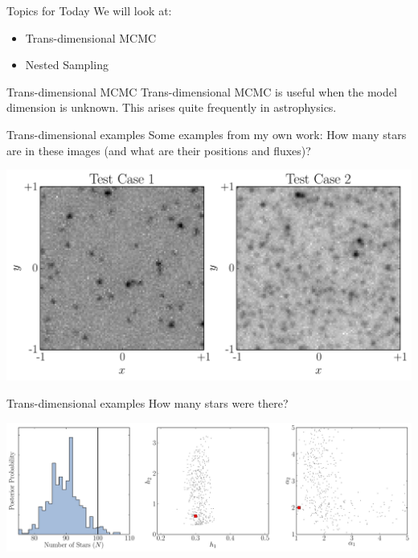 
\begin{frame}[t,plain]
\titlepage
\end{frame}

\begin{frame}[t]{Topics for Today}
We will look at:

\begin{itemize}
\item Trans-dimensional MCMC
\item Nested Sampling
\end{itemize}

\end{frame}


\begin{frame}[t]{Trans-dimensional MCMC}
Trans-dimensional MCMC is useful when the model dimension is unknown. This
arises quite frequently in astrophysics.
\end{frame}


\begin{frame}[t]{Trans-dimensional examples}
Some examples from my own work: How many stars are in these images (and what are their positions and fluxes)?

\begin{center}
\includegraphics[scale=0.4]{starfield.pdf}
\end{center}

\end{frame}

\begin{frame}[t]{Trans-dimensional examples}
How many stars were there?

\begin{center}
\includegraphics[scale=0.25]{inference1.pdf}
\end{center}

\end{frame}

